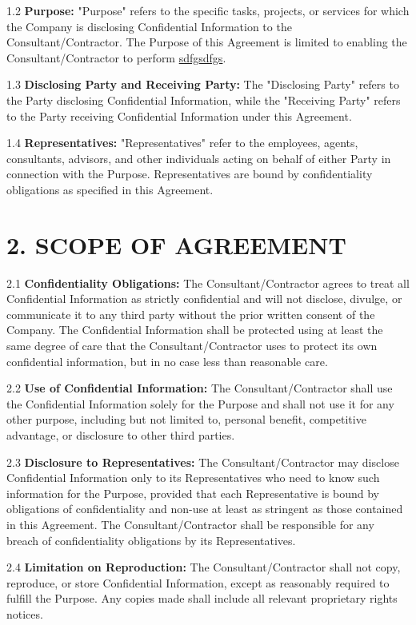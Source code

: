 \documentclass[12pt]{article}
\begin{document}
1.2 \textbf{Purpose:} "Purpose" refers to the specific tasks, projects, or services for which the Company is disclosing Confidential Information to the Consultant/Contractor. The Purpose of this Agreement is limited to enabling the Consultant/Contractor to perform \underline{sdfgsdfgs}.

1.3 \textbf{Disclosing Party and Receiving Party:} The "Disclosing Party" refers to the Party disclosing Confidential Information, while the "Receiving Party" refers to the Party receiving Confidential Information under this Agreement.

1.4 \textbf{Representatives:} "Representatives" refer to the employees, agents, consultants, advisors, and other individuals acting on behalf of either Party in connection with the Purpose. Representatives are bound by confidentiality obligations as specified in this Agreement.

\section*{2. SCOPE OF AGREEMENT}

2.1 \textbf{Confidentiality Obligations:} The Consultant/Contractor agrees to treat all Confidential Information as strictly confidential and will not disclose, divulge, or communicate it to any third party without the prior written consent of the Company. The Confidential Information shall be protected using at least the same degree of care that the Consultant/Contractor uses to protect its own confidential information, but in no case less than reasonable care.

2.2 \textbf{Use of Confidential Information:} The Consultant/Contractor shall use the Confidential Information solely for the Purpose and shall not use it for any other purpose, including but not limited to, personal benefit, competitive advantage, or disclosure to other third parties.

2.3 \textbf{Disclosure to Representatives:} The Consultant/Contractor may disclose Confidential Information only to its Representatives who need to know such information for the Purpose, provided that each Representative is bound by obligations of confidentiality and non-use at least as stringent as those contained in this Agreement. The Consultant/Contractor shall be responsible for any breach of confidentiality obligations by its Representatives.

2.4 \textbf{Limitation on Reproduction:} The Consultant/Contractor shall not copy, reproduce, or store Confidential Information, except as reasonably required to fulfill the Purpose. Any copies made shall include all relevant proprietary rights notices.
\end{document}
